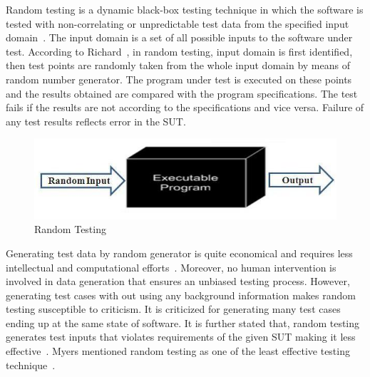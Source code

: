 Random testing is a dynamic black-box testing technique in which the software is tested with non-correlating or unpredictable test data from the specified input domain~\cite{Chan2002}. The input domain is a set of all possible inputs to the software under test. According to Richard~\cite{hamlet1994}, in random testing, input domain is first identified, then test points are randomly taken from the whole input domain by means of random number generator. The program under test is executed on these points and the results obtained are compared with the program specifications. The test fails if the results are not according to the specifications and vice versa. Failure of any test results reflects error in the SUT.

\begin{figure}[h]
	\centering
	\includegraphics[scale=0.5]{chapter3/randomTesting.jpg}
	\caption{Random Testing}
\end{figure}

Generating test data by random generator is quite economical and requires less intellectual and computational efforts~\cite{Ciupa2008a}. Moreover, no human intervention is involved in data generation that ensures an unbiased testing process. However, generating test cases with out using any background information makes random testing susceptible to criticism. It is criticized for generating many test cases ending up at the same state of software. It is further stated that, random testing generates test inputs that violates requirements of the given SUT making it less effective~\cite{pacheco2009directed, sen2007effective}. Myers mentioned random testing as one of the least effective testing technique~\cite{Myers1979}.

